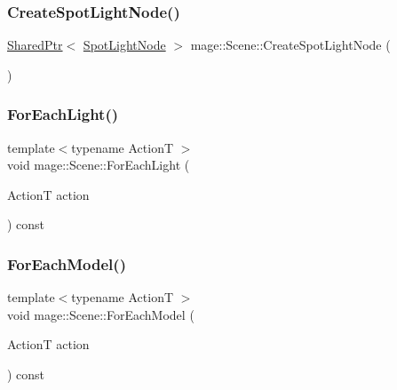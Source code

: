 \hypertarget{classmage_1_1_scene_a27ffb510eeb8e208ba20ee0d76138a3f}{}\label{classmage_1_1_scene_a27ffb510eeb8e208ba20ee0d76138a3f} 
\subsubsection{\texorpdfstring{Create\+Spot\+Light\+Node()}{CreateSpotLightNode()}}
{\footnotesize\ttfamily \hyperlink{namespacemage_a1e01ae66713838a7a67d30e44c67703e}{Shared\+Ptr}$<$ \hyperlink{namespacemage_a46c8f54b869a5dc07f520c600b9046bd}{Spot\+Light\+Node} $>$ mage\+::\+Scene\+::\+Create\+Spot\+Light\+Node (\begin{DoxyParamCaption}{ }\end{DoxyParamCaption})}

\hypertarget{classmage_1_1_scene_a131c27235c6f172a316c56fea7f2e80c}{}\label{classmage_1_1_scene_a131c27235c6f172a316c56fea7f2e80c} 
\subsubsection{\texorpdfstring{For\+Each\+Light()}{ForEachLight()}}
{\footnotesize\ttfamily template$<$typename ActionT $>$ \\
void mage\+::\+Scene\+::\+For\+Each\+Light (\begin{DoxyParamCaption}\item[{ActionT}]{action }\end{DoxyParamCaption}) const\hspace{0.3cm}{\ttfamily [private]}}

\hypertarget{classmage_1_1_scene_a6327548021f874f22a1adc81cfc8a1ea}{}\label{classmage_1_1_scene_a6327548021f874f22a1adc81cfc8a1ea} 
\subsubsection{\texorpdfstring{For\+Each\+Model()}{ForEachModel()}}
{\footnotesize\ttfamily template$<$typename ActionT $>$ \\
void mage\+::\+Scene\+::\+For\+Each\+Model (\begin{DoxyParamCaption}\item[{ActionT}]{action }\end{DoxyParamCaption}) const\hspace{0.3cm}{\ttfamily [private]}}

